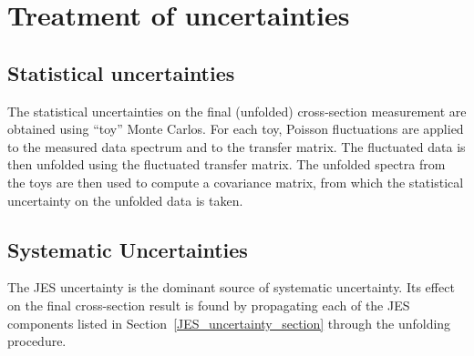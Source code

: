 


\section{Treatment of uncertainties}
\label{sec::uncertainties}
\subsection{Statistical uncertainties}

The statistical uncertainties on the final (unfolded) cross-section measurement are obtained using ``toy'' Monte Carlos. For each toy, Poisson fluctuations are applied to the measured data spectrum and to the transfer matrix. The fluctuated data is then unfolded using the fluctuated transfer matrix. The unfolded spectra from the toys are then used to compute a covariance matrix, from which the statistical uncertainty on the unfolded data is taken.

\subsection{Systematic Uncertainties}


The JES uncertainty is the dominant source of systematic uncertainty. Its effect on the final cross-section result is found by propagating each of the JES components listed in Section~\ref{JES_uncertainty_section} through the unfolding procedure. 

